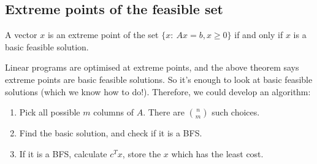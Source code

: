 \documentclass[egregdoesnotlikesansseriftitles,a4paper]{scrartcl}
\begin{document}
\subsection{Extreme points of the feasible set}
\begin{theorem}
	 A vector $x$ is an extreme point of the set $\{x: \ Ax=b, x \geq 0\}$ if and only if $x$ is a basic feasible solution.
\end{theorem}
\begin{remark}
	 Linear programs are optimised at extreme points, and the above theorem says extreme points are basic feasible solutions. So it's enough to look at basic feasible solutions (which we know how to do!). Therefore, we could develop an algorithm:
	 \begin{enumerate}
		 \item Pick all possible $m$ columns of $A$. There are $n \choose m $ such choices.
		 \item Find the basic solution, and check if it is a BFS.
		 \item If it is a BFS, calculate $c^Tx$, store the $x$ which has the least cost.
	 \end{enumerate}
\end{remark}
\end{document}
